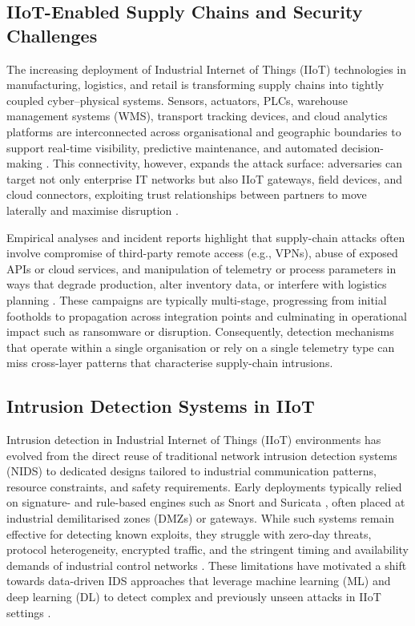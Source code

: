 \documentclass[pdflatex,sn-mathphys-num]{sn-jnl}
\theoremstyle{thmstyleone}%
\theoremstyle{thmstyletwo}%
\theoremstyle{thmstylethree}%
\begin{document}
\subsection{IIoT-Enabled Supply Chains and Security Challenges}
The increasing deployment of Industrial Internet of Things (IIoT) technologies in manufacturing, logistics, and retail is transforming supply chains into tightly coupled cyber--physical systems. Sensors, actuators, PLCs, warehouse management systems (WMS), transport tracking devices, and cloud analytics platforms are interconnected across organisational and geographic boundaries to support real-time visibility, predictive maintenance, and automated decision-making \cite{tsiknas2021cyber,dhirani2021iiot,taj2023iotSCM}. This connectivity, however, expands the attack surface: adversaries can target not only enterprise IT networks but also IIoT gateways, field devices, and cloud connectors, exploiting trust relationships between partners to move laterally and maximise disruption \cite{al2020supplychain4,iotsf2021supplychain,pt2025iioTThreats, kumar2024comprehensive}.

Empirical analyses and incident reports highlight that supply-chain attacks often involve compromise of third-party remote access (e.g., VPNs), abuse of exposed APIs or cloud services, and manipulation of telemetry or process parameters in ways that degrade production, alter inventory data, or interfere with logistics planning \cite{tsiknas2021cyber,dhirani2021iiot}. These campaigns are typically multi-stage, progressing from initial footholds to propagation across integration points and culminating in operational impact such as ransomware or disruption. Consequently, detection mechanisms that operate within a single organisation or rely on a single telemetry type can miss cross-layer patterns that characterise supply-chain intrusions.

\subsection{Intrusion Detection Systems in IIoT}
\label{subsec:ids_iiot}
Intrusion detection in Industrial Internet of Things (IIoT) environments has evolved from the direct reuse of traditional network intrusion detection systems (NIDS) to dedicated designs tailored to industrial communication patterns, resource constraints, and safety requirements. Early deployments typically relied on signature- and rule-based engines such as Snort and Suricata \cite{roesch1999snort,suricata}, often placed at industrial demilitarised zones (DMZs) or gateways. While such systems remain effective for detecting known exploits, they struggle with zero-day threats, protocol heterogeneity, encrypted traffic, and the stringent timing and availability demands of industrial control networks \cite{alotaibi2023iiotSurvey,rahman2025idsiot}. These limitations have motivated a shift towards data-driven IDS approaches that leverage machine learning (ML) and deep learning (DL) to detect complex and previously unseen attacks in IIoT settings \cite{anwer2025advancedIiotIds,gyamfi2022intrusionIot}.
\end{document}

